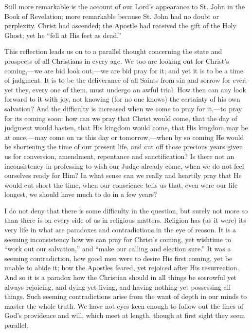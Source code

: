 Still more remarkable is the account of our Lord's appearance to
St. John in the Book of Revelation; more remarkable because St. John
had no doubt or perplexity. Christ had ascended; the Apostle had
received the gift of the Holy Ghost; yet he ``fell at His feet as
dead.''

This reflection leads us on to a parallel thought concerning the
state and prospects of all Christians in every age. We too are looking
out for Christ's coming,—we are bid look out,—we are bid pray for
it; and yet it is to be a time of judgment. It is to be the
deliverance of all Saints from sin and sorrow for ever; yet they,
every one of them, must undergo an awful trial. How then can any look
forward to it with joy, not knowing (for no one knows) the certainty
of his own salvation? And the difficulty is increased when we come to
pray for it,—to pray for its coming soon: how can we pray that
Christ would come, that the day of judgment would hasten, that His
kingdom would come, that His kingdom may be at once,—may come on us
this day or tomorrow,—when by so coming He would be shortening the
time of our present life, and cut off those precious years given us
for conversion, amendment, repentance and sanctification? Is there not
an inconsistency in professing to wish our Judge already come, when we
do not feel ourselves ready for Him? In what sense can we really and
heartily pray that He would cut short the time, when our conscience
tells us that, even were our life longest, we should have much to do
in a few years?

I do not deny that there is some difficulty in the question, but
surely not more so than there is on every side of us in religious
matters. Religion has (as it were) its very life in what are paradoxes
and contradictions in the eye of reason. It is a seeming inconsistency
how we can pray for Christ's coming, yet wish\textbf{}time to
``work out our salvation,'' and ``make our calling and
election sure.'' It was a seeming contradiction, how good men were
to desire His first coming, yet be unable to abide it; how the
Apostles feared, yet rejoiced after His resurrection. And so it is a
paradox how the Christian should in all things be sorrowful yet always
rejoicing, and dying yet living, and having nothing yet possessing all
things. Such seeming contradictions arise from the want of depth in
our minds to master the whole truth. We have not eyes keen enough to
follow out the lines of God's providence and will, which meet at
length, though at first sight they seem parallel.

